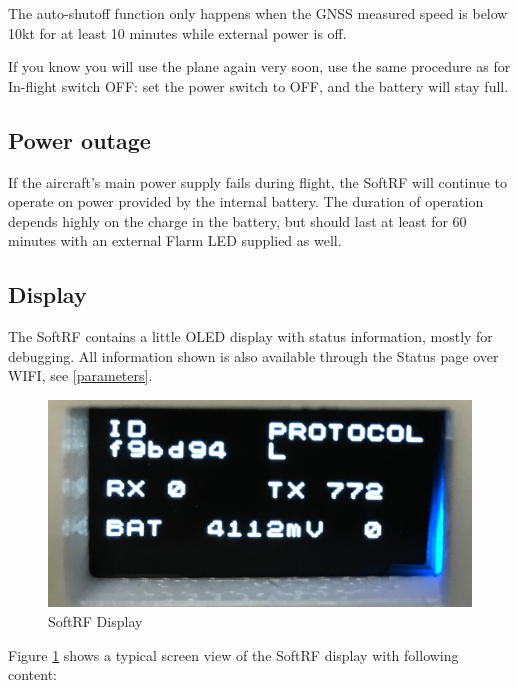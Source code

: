 \documentclass[11pt,a4paper]{article}
\begin{document}
The auto-shutoff function only happens when the GNSS measured speed is below 10kt for at least 10 minutes while external power is off.

If you know you will use the plane again very soon, use the same procedure as for In-flight switch OFF: set the power switch to OFF, and the battery will stay full.

\subsection{Power outage}
If the aircraft's main power supply fails during flight, the SoftRF will continue to operate on power provided by the internal battery. The duration of operation depends highly on the charge in the battery, but should last at least for 60 minutes with an external Flarm LED supplied as well.

\begin{center}
\end{center}

\subsection{Display}
The SoftRF contains a little OLED display with status information, mostly for debugging. All information shown is also available through the Status page over WIFI, see \ref{parameters}.

\begin{figure}[h]
\centering
\includegraphics[scale=.1]{display.jpg}
\caption{SoftRF Display}\label{display}
\end{figure}\FloatBarrier

Figure \ref{display} shows a typical screen view of the SoftRF display with following content:
\end{document}
